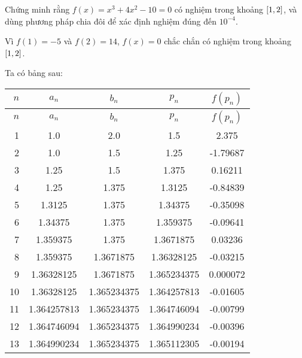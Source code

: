 \documentclass[../../Lectures]{subfiles}
\begin{document}
\begin{exmp}
    Chứng minh rằng \(f(x) = x^3 + 4x^2 - 10 = 0\) có nghiệm trong khoảng
    \(\interval{1}{2}\), và dùng phương pháp chia đôi để xác định nghiệm đúng
    đến \(10^{-4}\).

    Vì \(f(1) = -5\) và \(f(2) = 14\), \(f(x) = 0\) chắc chắn có nghiệm trong
    khoảng \(\interval{1}{2}\).

    Ta có bảng sau:

    \begin{longtable}{ r S[table-format=1.9] S[table-format=1.9] S[table-format=1.9] S[table-format=-1.6] }    %
        \toprule
         {\(n\)} &   {\(a_n\)}   &   {\(b_n\)}   &   {\(p_n\)}   & {\(f(p_n)\)} \\
        \midrule
        \endfirsthead
         {\(n\)} &   {\(a_n\)}   &   {\(b_n\)}   &   {\(p_n\)}   & {\(f(p_n)\)} \\
        \midrule
          &  1.0          &  2.0          &  1.5          &   2.375      \\
              2  &  1.0          &  1.5          &  1.25         &  -1.79687    \\
              3  &  1.25         &  1.5          &  1.375        &   0.16211    \\
              4  &  1.25         &  1.375        &  1.3125       &  -0.84839    \\
              5  &  1.3125       &  1.375        &  1.34375      &  -0.35098    \\
              6  &  1.34375      &  1.375        &  1.359375     &  -0.09641    \\
              7  &  1.359375     &  1.375        &  1.3671875    &   0.03236    \\
              8  &  1.359375     &  1.3671875    &  1.36328125   &  -0.03215    \\
              9  &  1.36328125   &  1.3671875    &  1.365234375  &   0.000072   \\
             10  &  1.36328125   &  1.365234375  &  1.364257813  &  -0.01605    \\
             11  &  1.364257813  &  1.365234375  &  1.364746094  &  -0.00799    \\
             12  &  1.364746094  &  1.365234375  &  1.364990234  &  -0.00396    \\
             13  &  1.364990234  &  1.365234375  &  1.365112305  &  -0.00194    \\
        \bottomrule
    \end{longtable}


\end{exmp}
\end{document}

